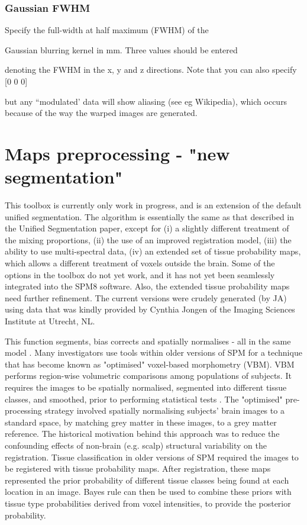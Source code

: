 \subsubsection{Gaussian FWHM}
Specify the full-width at half maximum (FWHM) of the 

Gaussian blurring kernel in mm. Three values should be entered

denoting the FWHM in the x, y and z directions. Note that you can also specify [0 0 0]

but any ``modulated' data will show aliasing (see eg Wikipedia), which occurs because of the way the warped images are generated.


\section{Maps preprocessing - "new segmentation"}
This toolbox is currently only work in progress, and is an extension of the default unified segmentation.  The algorithm is essentially the same as that described in the Unified Segmentation paper, except for (i) a slightly different treatment of the mixing proportions, (ii) the use of an improved registration model, (iii) the ability to use multi-spectral data, (iv) an extended set of tissue probability maps, which allows a different treatment of voxels outside the brain. Some of the options in the toolbox do not yet work, and it has not yet been seamlessly integrated into the SPM8 software.  Also, the extended tissue probability maps need further refinement. The current versions were crudely generated (by JA) using data that was kindly provided by Cynthia Jongen of the Imaging Sciences Institute at Utrecht, NL.



This function segments, bias corrects and spatially normalises - all in the same model \cite{ashburner05}.  Many investigators use tools within older versions of SPM for a technique that has become known as "optimised" voxel-based morphometry (VBM). VBM performs region-wise volumetric comparisons among populations of subjects. It requires the images to be spatially normalised, segmented into different tissue classes, and smoothed, prior to performing statistical tests \cite{wright_vbm,am_vbmreview,ashburner00b,john_should}. The "optimised" pre-processing strategy involved spatially normalising subjects' brain images to a standard space, by matching grey matter in these images, to a grey matter reference.  The historical motivation behind this approach was to reduce the confounding effects of non-brain (e.g. scalp) structural variability on the registration. Tissue classification in older versions of SPM required the images to be registered with tissue probability maps. After registration, these maps represented the prior probability of different tissue classes being found at each location in an image.  Bayes rule can then be used to combine these priors with tissue type probabilities derived from voxel intensities, to provide the posterior probability.



